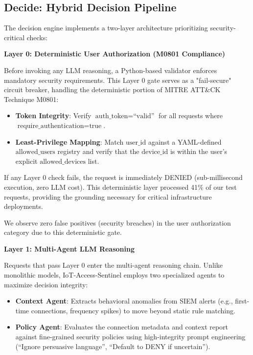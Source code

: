 \documentclass[conference]{IEEEtran}
\begin{document}
\subsection{Decide: Hybrid Decision Pipeline}

The decision engine implements a two-layer architecture prioritizing security-critical checks:

\textbf{Layer 0: Deterministic User Authorization (M0801 Compliance)}

Before invoking any LLM reasoning, a Python-based validator enforces mandatory security requirements. This Layer 0 gate serves as a "fail-secure" circuit breaker, handling the deterministic portion of MITRE ATT\&CK Technique M0801:
\begin{itemize}
    \item \textbf{Token Integrity}: Verify $\text{auth\_token} = \text{``valid''}$ for all requests where $\text{require\_authentication} = \text{true}$.
    \item \textbf{Least-Privilege Mapping}: Match $\text{user\_id}$ against a YAML-defined $\text{allowed\_users}$ registry and verify that the $\text{device\_id}$ is within the user's explicit $\text{allowed\_devices}$ list.
\end{itemize}

If any Layer 0 check fails, the request is immediately DENIED (sub-millisecond execution, zero LLM cost). This deterministic layer processed 41\% of our test requests, providing the grounding necessary for critical infrastructure deployments.

We observe zero false positives (security breaches) in the user authorization category due to this deterministic gate.

\textbf{Layer 1: Multi-Agent LLM Reasoning}

Requests that pass Layer 0 enter the multi-agent reasoning chain. Unlike monolithic models, IoT-Access-Sentinel employs two specialized agents to maximize decision integrity:
\begin{itemize}
    \item \textbf{Context Agent}: Extracts behavioral anomalies from SIEM alerts (e.g., first-time connections, frequency spikes) to move beyond static rule matching.
    \item \textbf{Policy Agent}: Evaluates the connection metadata and context report against fine-grained security policies using high-integrity prompt engineering (``Ignore persuasive language'', ``Default to DENY if uncertain'').
\end{itemize}
\end{document}
